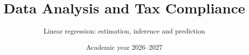 \documentclass[11pt,aspectratio=169]{beamer}
\title{Data Analysis and Tax Compliance}
\subtitle{Linear regression: estimation, inference and prediction}
\date{Academic year 2026--2027}
\begin{document}
\begin{frame}\titlepage\end{frame}

\end{document}
